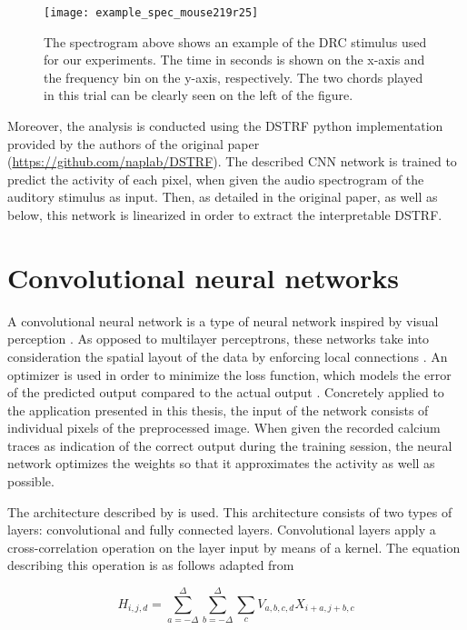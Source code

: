 \begin{figure}[ht]
\centering
	\texttt{[image: example\_spec\_mouse219r25]}
\caption{The spectrogram above shows an example of the DRC stimulus used for our experiments. The time in seconds is shown on the x-axis and the frequency bin on the y-axis, respectively. The two chords played in this trial can be clearly seen on the left of the figure.}
\end{figure}

Moreover, the analysis is conducted using the DSTRF python implementation provided by the authors of the original paper (\href{https://github.com/naplab/DSTRF}{https://github.com/naplab/DSTRF}). The described CNN network is trained to predict the activity of each pixel, when given the audio spectrogram of the auditory stimulus as input. Then, as detailed in the original paper, as well as below, this network is linearized in order to extract the interpretable DSTRF.

\section{Convolutional neural networks}

A convolutional neural network is a type of neural network inspired by visual perception \parencite{liSurveyConvolutionalNeural2022}. As opposed to multilayer perceptrons, these networks take into consideration the spatial layout of the data by enforcing local connections \parencite{zhangDiveDeepLearning2024}. An optimizer is used in order to minimize the loss function, which models the error of the predicted output compared to the actual output \parencite{liSurveyConvolutionalNeural2022}. Concretely applied to the application presented in this thesis, the input of the network consists of individual pixels of the preprocessed image. When given the recorded calcium traces as indication of the correct output during the training session, the neural network optimizes the weights so that it approximates the activity as well as possible. 
	
The architecture described by \textcite{keshishianEstimatingInterpretingNonlinear2020} is used. This architecture consists of two types of layers: convolutional and fully connected layers. Convolutional layers apply a cross-correlation operation on the layer input by means of a kernel. The equation describing this operation is as follows adapted from \textcite{zhangDiveDeepLearning2024}\:

\begin{equation}
	H_{i, j, d} = \sum_{a=-\Delta}^\Delta \sum_{b=-\Delta}^\Delta \sum_c V_{a, b, c ,d} X_{i+a, j+b, c}
\end{equation}


